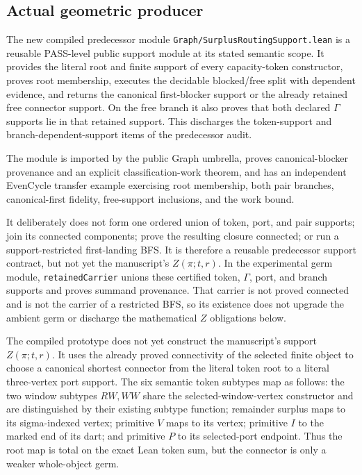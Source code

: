\documentclass[11pt]{article}
\begin{document}
\subsection*{Actual geometric producer}
The new compiled predecessor module
\texttt{Graph/SurplusRoutingSupport.lean} is a reusable PASS-level public
support module at its stated semantic scope.
It provides the literal root and finite support of every capacity-token
constructor, proves root membership, executes the decidable blocked/free split
with dependent evidence, and returns the canonical first-blocker support or
the already retained free connector support.  On the free branch it also
proves that both declared $\Gamma$ supports lie in that retained support.
This discharges the token-support and branch-dependent-support items of the
predecessor audit.

The module is imported by the public Graph umbrella, proves canonical-blocker
provenance and an explicit classification-work theorem, and has an independent
EvenCycle transfer example exercising root membership, both pair branches,
canonical-first fidelity, free-support inclusions, and the work bound.

It deliberately does not form one ordered union of token, port, and pair
supports; join its connected components; prove the resulting closure
connected; or run a support-restricted first-landing BFS.  It is therefore a
reusable predecessor support contract, but not yet the manuscript's
$Z(\pi;t,r)$.  In the experimental germ module, \texttt{retainedCarrier}
unions these certified token, $\Gamma$, port, and branch supports and proves
summand provenance.  That carrier is not proved connected and is not the
carrier of a restricted BFS, so its existence does not upgrade the ambient
germ or discharge the mathematical $Z$ obligations below.

The compiled prototype does not yet construct the manuscript's support
$Z(\pi;t,r)$.  It uses the already proved connectivity of the selected finite
object to choose a canonical shortest connector from the literal token root
to a literal three-vertex port support.  The six semantic token subtypes map
as follows: the two window subtypes $RW,WW$ share the selected-window-vertex
constructor and are distinguished by their existing subtype function;
remainder surplus maps to its sigma-indexed vertex; primitive $V$ maps to its
vertex; primitive $I$ to the marked end of its dart; and primitive $P$ to its
selected-port endpoint.  Thus the root map is total on the exact Lean token
sum, but the connector is only a weaker whole-object germ.
\end{document}
